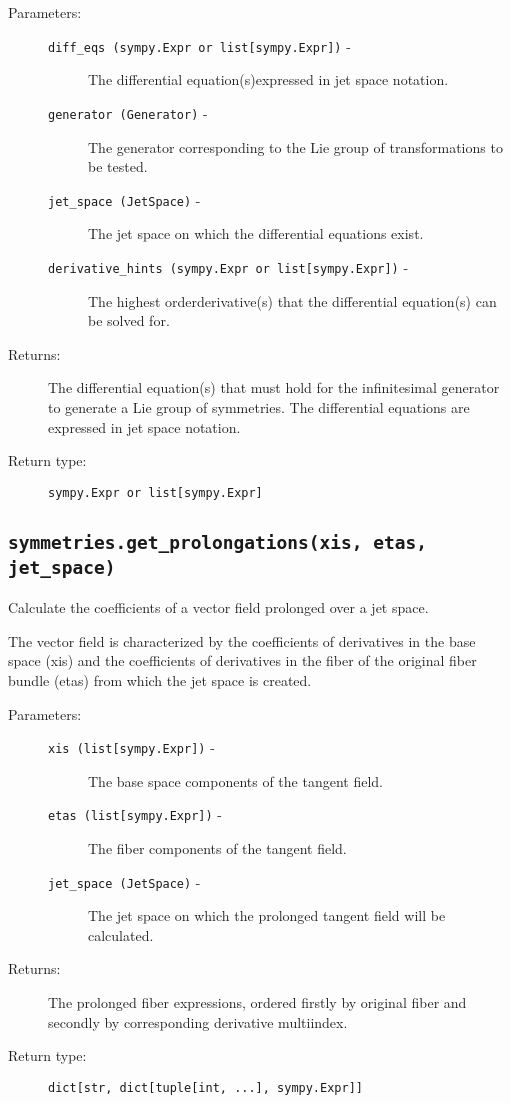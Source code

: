    \begin{description}
      \item[Parameters:] \leavevmode
        \begin{description}
            \item[\lstinline{diff_eqs (sympy.Expr or list[sympy.Expr])} -] The differential equation(s)\newline expressed in jet space notation.
            \item[\lstinline{generator (Generator)} -] The generator corresponding to the Lie group of transformations to be tested.
            \item[\lstinline{jet_space (JetSpace)} -] The jet space on which the differential equations exist.
            \item[\lstinline{derivative_hints (sympy.Expr or list[sympy.Expr])} -] The highest order\newline derivative(s) that the differential equation(s) can be solved for.
        \end{description}

      \item[Returns:] The differential equation(s) that must hold for the infinitesimal generator to generate a Lie group of symmetries. The differential equations are expressed in jet space notation.
      \item[Return type:] \lstinline{sympy.Expr or list[sympy.Expr]}
   \end{description}

\subsection*{\lstinline{symmetries.get_prolongations(xis, etas, jet_space)}}

   Calculate the coefficients of a vector field prolonged over a jet
   space.

   The vector field is characterized by the coefficients of
   derivatives in the base space (xis) and the coefficients of
   derivatives in the fiber of the original fiber bundle (etas) from
   which the jet space is created.

   \begin{description}
      \item[Parameters:] \leavevmode
        \begin{description}
            \item[\lstinline{xis (list[sympy.Expr])} -] The base space components of the tangent field.
            \item[\lstinline{etas (list[sympy.Expr])} -] The fiber components of the tangent field.
            \item[\lstinline{jet_space (JetSpace)} -] The jet space on which the prolonged tangent field will be calculated.
        \end{description}
      \item[Returns:] The prolonged fiber expressions, ordered firstly by original fiber and secondly by corresponding derivative multiindex.
      \item[Return type:] \lstinline{dict[str, dict[tuple[int, ...], sympy.Expr]]}
   \end{description}

